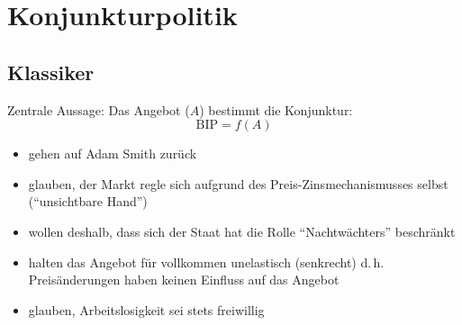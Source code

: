 \section{Konjunkturpolitik}
\subsection{Klassiker}
Zentrale Aussage: Das Angebot ($A$) bestimmt die Konjunktur:
\begin{equation*}
		\mbox{BIP} = f(A)
\end{equation*}
 

\begin{itemize}\itemsep0em
	\item gehen auf Adam Smith zurück
	\item glauben, der Markt regle sich aufgrund des Preis-Zinsmechanismusses selbst (\enquote{unsichtbare Hand})
	\item wollen deshalb, dass sich der Staat hat die Rolle \enquote{Nachtwächters} beschränkt 
	\item halten das Angebot für vollkommen unelastisch (senkrecht) d.\,h. Preisänderungen haben keinen Einfluss auf das Angebot
	\item glauben, Arbeitslosigkeit sei stets freiwillig
\end{itemize}

